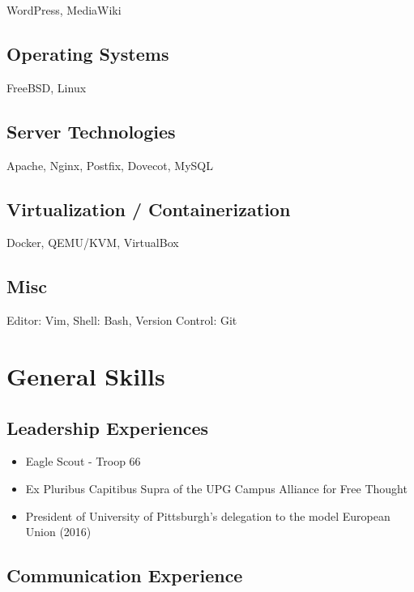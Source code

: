 \documentclass{article}
\begin{document}
WordPress, MediaWiki

\subsection{Operating Systems}

FreeBSD, Linux

\subsection{Server Technologies}

Apache, Nginx, Postfix, Dovecot, MySQL

\subsection{Virtualization / Containerization}

Docker, QEMU/KVM, VirtualBox

\subsection{Misc}

Editor: Vim, Shell: Bash, Version Control: Git

\section{General Skills}

\subsection{Leadership Experiences}

\begin{itemize}
\item Eagle Scout - Troop 66

\item Ex Pluribus Capitibus Supra of the UPG Campus Alliance for Free Thought

\item President of University of Pittsburgh's delegation to the model European Union (2016)
\end{itemize}

\subsection{Communication Experience}
\end{document}

